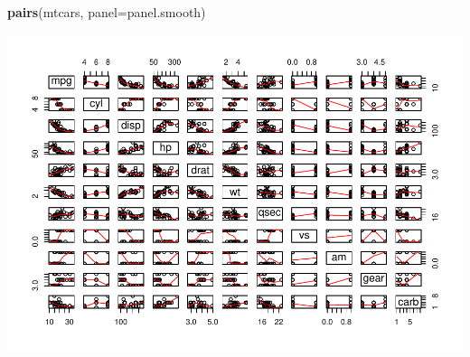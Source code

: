 \documentclass[]{article}
\newenvironment{Shaded}{\begin{snugshade}}{\end{snugshade}}
\newcommand{\KeywordTok}[1]{\textcolor[rgb]{0.13,0.29,0.53}{\textbf{{#1}}}}
\newcommand{\DataTypeTok}[1]{\textcolor[rgb]{0.13,0.29,0.53}{{#1}}}
\newcommand{\NormalTok}[1]{{#1}}
\begin{document}
\begin{Shaded}
\begin{Highlighting}[]
\KeywordTok{pairs}\NormalTok{(mtcars, }\DataTypeTok{panel=}\NormalTok{panel.smooth)}
\end{Highlighting}
\end{Shaded}

\includegraphics{statproject_files/figure-latex/unnamed-chunk-7-1.pdf}
\end{document}
